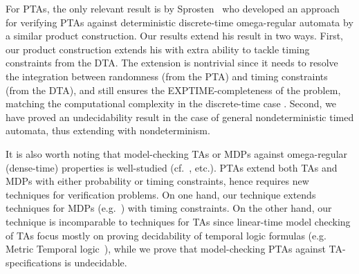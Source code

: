 For PTAs, the only relevant result is by Sprosten~\cite{DBLP:conf/qest/Sproston11} who developed an approach for verifying PTAs against deterministic discrete-time omega-regular automata by a similar product construction.
Our results extend his result in two ways.
First, our product construction extends his with extra ability to tackle timing constraints from the DTA.
The extension is nontrivial since it needs to resolve the integration between randomness (from the PTA) and timing constraints (from the DTA), and still ensures the EXPTIME-completeness of the problem, matching the computational complexity in the discrete-time case \cite{DBLP:conf/qest/Sproston11}.
Second, we have proved an undecidability result in the case of general nondeterministic timed automata, thus extending \cite{DBLP:conf/qest/Sproston11} with nondeterminism.

It is also worth noting that model-checking TAs or MDPs against omega-regular (dense-time) properties is well-studied (cf.~\cite{DBLP:books/daglib/0020348,DBLP:conf/lics/OuaknineW05,DBLP:conf/arts/Vardi99}, etc.).
PTAs extend both TAs and MDPs with either probability or timing constraints,
hence requires new techniques for verification problems.
On one hand, our technique extends techniques for MDPs (e.g.~\cite{DBLP:conf/arts/Vardi99}) with timing constraints.
On the other hand, our technique is incomparable to techniques for TAs since linear-time model checking of TAs focus mostly on proving decidability of temporal logic formulas (e.g. Metric Temporal logic~\cite{DBLP:journals/rts/Koymans90}),
while we prove that model-checking PTAs against TA-specifications is undecidable.  
 
